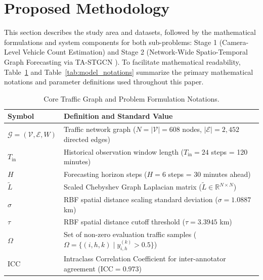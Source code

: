 \documentclass[a4paper,fleqn]{cas-sc}
\begin{document}
\section{Proposed Methodology}
\label{sec:methods}

This section describes the study area and datasets, followed by the mathematical formulations and system components for both sub-problems: Stage 1 (Camera-Level Vehicle Count Estimation) and Stage 2 (Network-Wide Spatio-Temporal Graph Forecasting via TA-STGCN \cite{stgcn, attention}). To facilitate mathematical readability, Table~\ref{tab:graph_notations} and Table~\ref{tab:model_notations} summarize the primary mathematical notations and parameter definitions used throughout this paper.

\begin{table}[pos=htbp]
\centering
\footnotesize
\setlength{\tabcolsep}{4pt}
\renewcommand{\arraystretch}{1.1}
\caption{Core Traffic Graph and Problem Formulation Notations.}
\label{tab:graph_notations}
\begin{tabular}{ll}
\toprule
\textbf{Symbol} & \textbf{Definition and Standard Value} \\
\midrule
$\mathcal{G} = (\mathcal{V}, \mathcal{E}, W)$ & Traffic network graph ($N = |\mathcal{V}| = 608$ nodes, $|\mathcal{E}| = 2,452$ directed edges) \\
$T_{\text{in}}$ & Historical observation window length ($T_{\text{in}} = 24$ steps = 120 minutes) \\
$H$ & Forecasting horizon steps ($H = 6$ steps = 30 minutes ahead) \\
$\tilde{L}$ & Scaled Chebyshev Graph Laplacian matrix ($\tilde{L} \in \mathbb{R}^{N \times N}$) \\
$\sigma$ & RBF spatial distance scaling standard deviation ($\sigma = 1.0887$ km) \\
$\tau$ & RBF spatial distance cutoff threshold ($\tau = 3.3945$ km) \\
$\Omega$ & Set of non-zero evaluation traffic samples ($\Omega = \{(i,h,k) \mid y_{i,h}^{(k)} > 0.5\}$) \\
$\text{ICC}$ & Intraclass Correlation Coefficient for inter-annotator agreement ($\text{ICC} = 0.973$) \\
\bottomrule
\end{tabular}%
\end{table}
\end{document}
